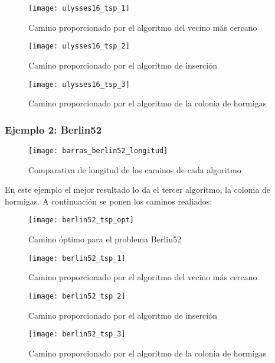 \begin{figure}[h]	\texttt{[image: ulysses16\_tsp\_1]} \centering
	\caption{Camino proporcionado por el algoritmo del vecino más cercano} \end{figure}

\begin{figure}[h]	\texttt{[image: ulysses16\_tsp\_2]} \centering
	\caption{Camino proporcionado por el algoritmo de inserción} \end{figure}

\begin{figure}[h]	\texttt{[image: ulysses16\_tsp\_3]} \centering
	\caption{Camino proporcionado por el algoritmo de la colonia de hormigas} \end{figure}

\clearpage
\subsubsection{Ejemplo 2: Berlin52}


\begin{figure}[h]	\texttt{[image: barras\_berlin52\_longitud]} \centering
	\caption{Comparativa de longitud de los caminos de cada algoritmo} \end{figure}


En este ejemplo el mejor resultado lo da el tercer algoritmo, la colonia de hormigas. A continuación se ponen los caminos realiados:

\begin{figure}[h]   \texttt{[image: berlin52\_tsp\_opt]} \centering
	\caption{Camino óptimo para el problema Berlin52} \end{figure}

\begin{figure}	\texttt{[image: berlin52\_tsp\_1]} \centering
	\caption{Camino proporcionado por el algoritmo del vecino más cercano} \end{figure}

\begin{figure}	\texttt{[image: berlin52\_tsp\_2]} \centering
	\caption{Camino proporcionado por el algoritmo de inserción} \end{figure}

\begin{figure}	\texttt{[image: berlin52\_tsp\_3]} \centering
	\caption{Camino proporcionado por el algoritmo de la colonia de hormigas} \end{figure}

